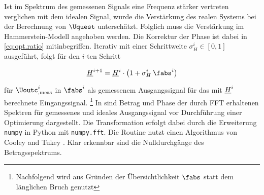 \documentclass[../Report.tex]{subfiles}
\begin{document}
Ist im Spektrum des gemessenen Signals eine Frequenz stärker vertreten verglichen mit dem idealen Signal, wurde die Verstärkung des realen Systems bei der Berechnung von $\Uquest$ unterschätzt. Folglich muss die Verstärkung im Hammerstein-Modell angehoben werden. Die Korrektur der Phase ist dabei in \eqref{eq:opt.ratio} mitinbegriffen.
Iterativ mit einer Schrittweite $\sigma_H^i \in \left[ 0 , 1 \right]$ ausgeführt, folgt für den $i$-ten Schritt

\begin{align}
\label{eq:opt.Hnew}
	\Hcompl^{i+1}
		=\Hcompl^{i} \cdot
		\left( 1 + \sigma_H^i \: \fabs^{i}	\right)					 
\end{align}

für $\Uoutc_{, \mathrm{meas}}^{i}$ in $\fabs^{i}$ als gemessenem Ausgangssignal für das mit $\underline{H}^{i}$ berechnete Eingangssignal.
\footnote{Nachfolgend wird aus Gründen der Übersichtlichkeit $\fabs$ statt dem länglichen Bruch genutzt} 
In  sind Betrag und Phase der durch FFT erhaltenen Spektren für gemessenes und ideales Ausgangssignal vor Durchführung einer Optimierung dargestellt. Die Transformation erfolgt dabei durch die Erweiterung \lstinline{numpy} in Python mit \lstinline{numpy.fft}. Die Routine nutzt einen Algorithmus von Cooley and Tukey \cite[S. 297-301]{cooley65}.
Klar erkennbar sind die Nulldurchgänge des Betragsspektrums. 
\\

 \absSpectIdeal 
{} \absSpectMeas
{} \angleSpectIdeal 
{} \angleSpectMeas 
\end{document}
